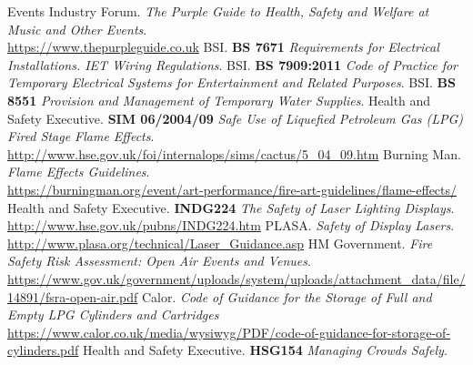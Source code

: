\restoregeometry
\newpage
\begin{thebibliography}{18}
    Events Industry Forum.
    \textit{The Purple Guide to Health, Safety and Welfare at Music and Other Events}. \\
    \href{https://www.thepurpleguide.co.uk}{https://www.thepurpleguide.co.uk}
    BSI.
    \textbf{BS 7671} \textit{Requirements for Electrical Installations. IET Wiring Regulations}.
    BSI.
    \textbf{BS 7909:2011} \textit{Code of Practice for Temporary Electrical Systems for Entertainment and Related Purposes}.
    BSI.
    \textbf{BS 8551} \textit{Provision and Management of Temporary Water Supplies}.
    Health and Safety Executive.
    \textbf{SIM 06/2004/09} \textit{Safe Use of Liquefied Petroleum Gas (LPG) Fired Stage Flame Effects}. \\
    \href{http://www.hse.gov.uk/foi/internalops/sims/cactus/5\_04\_09.htm}{http://www.hse.gov.uk/foi/internalops/sims/cactus/5\_04\_09.htm}
    Burning Man.
    \textit{Flame Effects Guidelines}. \\
    \href{https://burningman.org/event/art-performance/fire-art-guidelines/flame-effects/}{https://burningman.org/event/art-performance/fire-art-guidelines/flame-effects/}
    Health and Safety Executive.
    \textbf{INDG224} \textit{The Safety of Laser Lighting Displays}. \\
        \href{http://www.hse.gov.uk/pubns/INDG224.htm}{http://www.hse.gov.uk/pubns/INDG224.htm}
    PLASA.
    \textit{Safety of Display Lasers}. \\
    \href{http://www.plasa.org/technical/Laser\_Guidance.asp}{http://www.plasa.org/technical/Laser\_Guidance.asp}
    HM Government.
    \textit{Fire Safety Risk Assessment: Open Air Events and Venues}. \\
    \href{https://www.gov.uk/government/uploads/system/uploads/attachment\_data/file/14891/fsra-open-air.pdf}{https://www.gov.uk/government/uploads/system/uploads/attachment\_data/file/14891/fsra-open-air.pdf}
    Calor.
    \textit{Code of Guidance for the Storage of Full and Empty LPG Cylinders and Cartridges}
    \href{https://www.calor.co.uk/media/wysiwyg/PDF/code-of-guidance-for-storage-of-cylinders.pdf}{https://www.calor.co.uk/media/wysiwyg/PDF/code-of-guidance-for-storage-of-cylinders.pdf}
    Health and Safety Executive.
    \textbf{HSG154} \textit{Managing Crowds Safely}. \\

\end{thebibliography}
